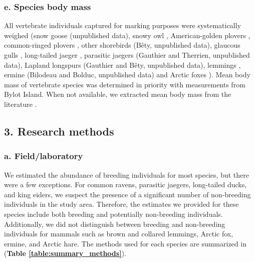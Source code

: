 \documentclass[a4paper,twoside,12pt]{article}
\begin{document}
\subsubsection*{e. Species body mass}
All vertebrate individuals captured for marking purposes were systematically weighed (snow goose (unpublished data), snowy owl \citep{therrien2012, robillard2018}, American-golden plovers \citep{lamarre2021},  common-ringed plovers \citep{leandri2019}, other shorebirds (Bêty, unpublished data), glaucous gulls \citep{gauthier2015}, long-tailed jaeger \citep{seyer2019}, parasitic jaegers (Gauthier and Therrien, unpublished data), Lapland longspurs (Gauthier and Bêty, unpublished data), lemmings \citep{gauthier2020lemmings}, ermine (Bilodeau and Bolduc, unpublished data) and Arctic foxes \citep{lai2015}). Mean body mass of vertebrate species was determined in priority with measurements from Bylot Island. When not available, we extracted mean body mass from the literature \citep{wilman2014}.
\newpage
        		

    \subsection*{3.  Research methods}
    		\subsubsection*{a. Field/laboratory}
We estimated the abundance of breeding individuals for most species, but there were a few exceptions. For common ravens, parasitic jaegers, long-tailed ducks, and king eiders, we suspect the presence of a significant number of non-breeding individuals in the study area. Therefore, the estimates we provided for these species include both breeding and potentially non-breeding individuals. Additionally, we did not distinguish between breeding and non-breeding individuals for mammals such as brown and collared lemmings, Arctic fox, ermine, and Arctic hare. The methods used for each species are summarized in (\textbf{Table \ref{table:summary_methods}}).
\newpage
\end{document}
